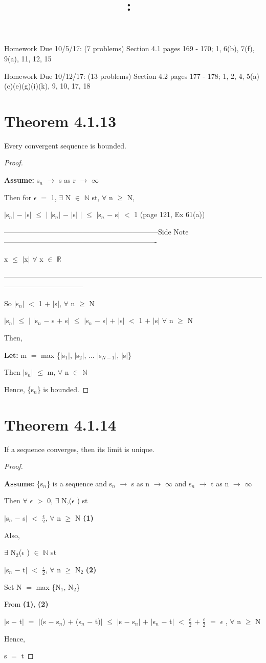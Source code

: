 \documentclass{article}
\title{
    \vspace{2in}
    \textmd{\textbf{\hmwkClass:\ \hmwkTitle}}\\
    \normalsize\vspace{0.1in}\small\vspace{0.1in}\large{\textit{\hmwkClassInstructor}}
    \vspace{3in}
}
\author{\hmwkAuthorName}
\date{}
\newcommand{\mt}[1]{\ensuremath{#1}}
\newcommand\bsc[2][\DefaultOpt]{%
  \def\DefaultOpt{#2}%
  \section[#1]{#2}%
}
\newcommand{\bgpf}{\begin{proof} $ $\newline}
\newcommand{\lt}[1]{\textbf{Let: } #1}
\newcommand{\as}[1]{\textbf{Assume: } #1}
\newcommand{\bpth}[1]{\textbf{(#1)}}
\newcommand{\epf}{\end{proof}}
\newcommand{\sidenote}[1]{-----------------------------------------------------------------Side Note----------------------------------------------------------------
#1 \

---------------------------------------------------------------------------------------------------------------------------------------------}
\newcommand{\br}{\mt{\mathbb{R}} }       %
\newcommand{\bn}{\mt{\mathbb{N}} }       %
\newcommand{\ep}{\mt{\epsilon} }         %
\newcommand{\fa}{\mt{\forall} }          %
\newcommand{\mem}{\mt{\in} }
\newcommand{\exs}{\mt{\exists} }
\newcommand{\lra}{ \mt{\longrightarrow} } %
\newcommand{\eql}{\mt{=} }
\newcommand{\uw}[2]{#1\mt{_{#2}}}
\newcommand{\frc}[2]{\mt{\frac{#1}{#2}}}
\begin{document}
Homework Due 10/5/17: (7 problems) Section 4.1 pages 169 - 170; 1, 6(b), 7(f), 9(a), 11, 12, 15

Homework Due 10/12/17: (13 problems) Section 4.2 pages 177 - 178; 1, 2, 4, 5(a)(c)(e)(g)(i)(k), 9, 10, 17, 18

\bsc{Theorem 4.1.13}{

Every convergent sequence is bounded.

\bgpf

\as{\uw{s}{n} \lra s as r \lra $\infty$}

Then for \ep \eql 1, \exs N \mem \bn st, \fa n $\geq$ N,

$|$\uw{s}{n}$|$ $-$ $|$s$|$ $\leq$ $|$ $|$\uw{s}{n}$|$ $-$ $|$s$|$ $|$ $\leq$ $|$\uw{s}{n} $-$ s$|$ $<$ 1  (page 121, Ex 61(a))

\sidenote{
x $\leq$ $|$x$|$ \fa x \mem \br
}

So $|$\uw{s}{n}$|$ $<$ 1 $+$ $|$s$|$, \fa n $\geq$ N

$|$\uw{s}{n}$|$ $\leq$ $|$ $|$\uw{s}{n} $-$ s $+$ s$|$ $\leq$ $|$\uw{s}{n} $-$ s$|$ $+$ $|$s$|$ $<$ 1 $+$ $|$s$|$ \fa n $\geq$ N

Then,

\lt{m \eql max \{$|$\uw{s}{1}$|$, $|$\uw{s}{2}$|$, ... $|$\uw{s}{N - 1}$|$, $|$s$|$}\}

Then $|$\uw{s}{n}$|$ $\leq$ m, \fa n \mem \bn

Hence, \{\uw{s}{n}\} is bounded.

\epf

}

\bsc{Theorem 4.1.14}{

If a sequence converges, then its limit is unique.

\bgpf

\as{\{\uw{s}{n}\} is a sequence and \uw{s}{n} \lra s as n \lra $\infty$ and \uw{s}{n} \lra t as n \lra $\infty$}

Then \fa \ep $>$ 0, \exs N,(\ep) st

$|$\uw{s}{n} $-$ s$|$ $<$ \frc{\epsilon}{2}, \fa n $\geq$ N \bpth{1}

Also,

\exs \uw{N}{2}(\ep) \mem \bn st

$|$\uw{s}{n} $-$ t$|$ $<$ \frc{\ep}{2}, \fa n $\geq$ \uw{N}{2} \bpth{2}

Set N \eql max \{\uw{N}{1}, \uw{N}{2}\}

From \bpth{1}, \bpth{2}

$|$s $-$ t$|$ \eql $|$(s $-$ \uw{s}{n}) $+$ (\uw{s}{n} $-$ t)$|$ $\leq$ $|$s $-$ \uw{s}{n}$|$ $+$ $|$\uw{s}{n} $-$ t$|$ $<$ \frc{\epsilon}{2} $+$ \frc{\epsilon}{2} \eql \ep, \fa n $\geq$ N

Hence,

s \eql t

\epf

}
\end{document}
